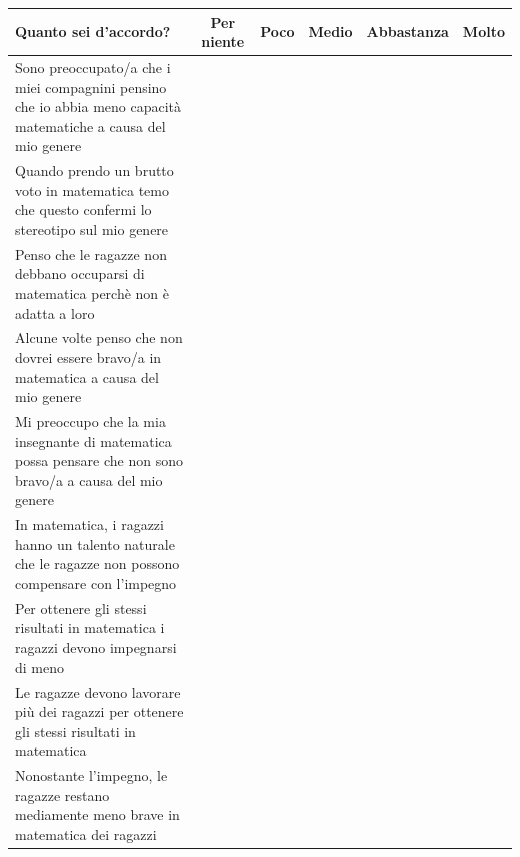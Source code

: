 \documentclass[11pt]{article}
\begin{document}
\noindent\begin{tabular}{|p{7cm}|c|c|c|c|c|}
  \hline
  \textbf{Quanto sei d'accordo?} & \textbf{Per niente} & \textbf{Poco} & \textbf{Medio} & \textbf{Abbastanza} & \textbf{Molto} \\
  \hline
  Sono preoccupato/a che i miei compagnini pensino che io abbia meno capacità matematiche a causa del mio genere & & & & & \\
  \hline
  Quando prendo un brutto voto in matematica temo che questo confermi lo stereotipo sul mio genere & & & & & \\
  \hline
  Penso che le ragazze non debbano occuparsi di matematica perchè non è adatta a loro & & & & & \\
  \hline
  Alcune volte penso che non dovrei essere bravo/a in matematica a causa del mio genere & & & & & \\
  \hline
  Mi preoccupo che la mia insegnante di matematica possa pensare che non sono bravo/a a causa del mio genere & & & & & \\
  \hline
  In matematica, i ragazzi hanno un talento naturale che le ragazze non possono compensare con l’impegno & & & & & \\
  \hline 
  Per ottenere gli stessi risultati in matematica i ragazzi devono impegnarsi di meno & & & & & \\
  \hline
  Le ragazze devono lavorare più dei ragazzi per ottenere gli stessi risultati in matematica & & & & & \\
  \hline
  Nonostante l’impegno, le ragazze restano mediamente meno brave in matematica dei ragazzi & & & & & \\
  \hline
\end{tabular}
\end{document}
